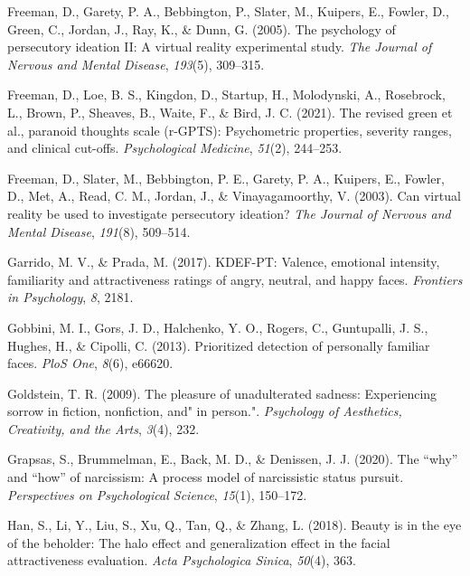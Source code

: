 \documentclass[
  man,
  floatsintext,
  longtable,
  nolmodern,
  notxfonts,
  notimes,
  colorlinks=true,linkcolor=blue,citecolor=blue,urlcolor=blue]{apa7}
\newlength{\cslhangindent}
\newenvironment{CSLReferences}[2] %
 {\begin{list}{}{%
  \setlength{\itemindent}{0pt}
  \setlength{\leftmargin}{0pt}
  \setlength{\parsep}{0pt}
  \ifodd #1
   \setlength{\leftmargin}{\cslhangindent}
   \setlength{\itemindent}{-1\cslhangindent}
  \fi
  \setlength{\itemsep}{#2\baselineskip}}}
 {\end{list}}
\begin{document}
\begin{CSLReferences}{1}{0}
Freeman, D., Garety, P. A., Bebbington, P., Slater, M., Kuipers, E.,
Fowler, D., Green, C., Jordan, J., Ray, K., \& Dunn, G. (2005). The
psychology of persecutory ideation II: A virtual reality experimental
study. \emph{The Journal of Nervous and Mental Disease}, \emph{193}(5),
309--315.

Freeman, D., Loe, B. S., Kingdon, D., Startup, H., Molodynski, A.,
Rosebrock, L., Brown, P., Sheaves, B., Waite, F., \& Bird, J. C. (2021).
The revised green et al., paranoid thoughts scale (r-GPTS): Psychometric
properties, severity ranges, and clinical cut-offs. \emph{Psychological
Medicine}, \emph{51}(2), 244--253.

Freeman, D., Slater, M., Bebbington, P. E., Garety, P. A., Kuipers, E.,
Fowler, D., Met, A., Read, C. M., Jordan, J., \& Vinayagamoorthy, V.
(2003). Can virtual reality be used to investigate persecutory ideation?
\emph{The Journal of Nervous and Mental Disease}, \emph{191}(8),
509--514.

Garrido, M. V., \& Prada, M. (2017). KDEF-PT: Valence, emotional
intensity, familiarity and attractiveness ratings of angry, neutral, and
happy faces. \emph{Frontiers in Psychology}, \emph{8}, 2181.

Gobbini, M. I., Gors, J. D., Halchenko, Y. O., Rogers, C., Guntupalli,
J. S., Hughes, H., \& Cipolli, C. (2013). Prioritized detection of
personally familiar faces. \emph{PloS One}, \emph{8}(6), e66620.

Goldstein, T. R. (2009). The pleasure of unadulterated sadness:
Experiencing sorrow in fiction, nonfiction, and" in person.".
\emph{Psychology of Aesthetics, Creativity, and the Arts}, \emph{3}(4),
232.

Grapsas, S., Brummelman, E., Back, M. D., \& Denissen, J. J. (2020). The
{``why''} and {``how''} of narcissism: A process model of narcissistic
status pursuit. \emph{Perspectives on Psychological Science},
\emph{15}(1), 150--172.

Han, S., Li, Y., Liu, S., Xu, Q., Tan, Q., \& Zhang, L. (2018). Beauty
is in the eye of the beholder: The halo effect and generalization effect
in the facial attractiveness evaluation. \emph{Acta Psychologica
Sinica}, \emph{50}(4), 363.


\end{CSLReferences}
\end{document}

